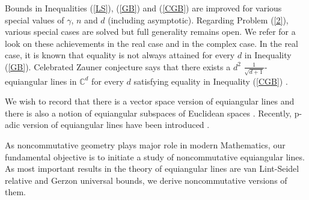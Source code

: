 \documentclass{amsart}
\begin{document}
Bounds in Inequalities  (\ref{LS}),  (\ref{GB}) and (\ref{CGB}) are  improved for various special values of $\gamma$, $n$ and $d$ (including asymptotic). Regarding Problem (\ref{2}), various special cases are solved but full generality remains open. We refer \cite{BUKH, JIANGTIDORYAOZHANGZAO, BALLADRAXLERKEEVASHSUDAKOV, BARGYU, DECAEN, MALOZEMOPEVNYI, NEUMAIER, JIANGPOLYANSKII, DELAATMACHADODEOLIVEIRAFERNANDAVELLENTIN, GREAVESKOOLENMUNEMASASZOLLOSO, GREAVSSYATRIADIYATSYNA, OKUDAYU, YU, KINGTANG, CONWAYHARDINSLOANE, GREAVESSYATRIADI2, GREAVESSYATRIADIYATSYNA2, SEIDELHANDBOOK, GREAVES7, KOORNWINDER, LINYU, LINYU2, ZHAO, COUTINHOGODSILSHIRAZIZHAN}
 for a look on these achievements in the real case and \cite{JEDWABWIEBE, JEDWABWIEBE2, GODSILROY, SUSTIKTROPPDHILLON, STROHMER, HOFFMANSOLAZZO, BROUWERHAEMERS}
    in the complex case. In the real case, it is known that equality is not always attained for  every $d$ in Inequality (\ref{GB}).   Celebrated Zauner conjecture says that  there exists a   $d^2$ $\frac{1}{\sqrt{d+1}}$-equiangular lines in $\mathbb{C}^d$ for every $d$ satisfying equality in Inequality (\ref{CGB}) \cite{ZAUNER, RENESBLUMEKOHOUTSCOTTCAVES, APPLEBY, APPLEBYBENGTSSONFLAMMIAGOYENECHE, KOPP, APPLEBYFLAMMIAMCCONNELLYARD, SCOTT}.


We wish to record that there is  a vector space version of equiangular lines \cite{GREAVESIVERSONJASPERMIXON2, GREAVESIVERSONJASPERMIXON}  and  there is also a notion of  equiangular subspaces of Euclidean spaces \cite{BALLASUDAKOV, BALLADRAXLERKEEVASHSUDAKOV2}. Recently, p-adic version of equiangular lines have been introduced \cite{MAHESH}.

As noncommutative geometry plays major role in modern Mathematics, our fundamental objective is to initiate a study of noncommutative equiangular lines. As most important results in the theory of equiangular lines are van Lint-Seidel relative and Gerzon universal bounds, we derive noncommutative versions of them. 
\end{document}
